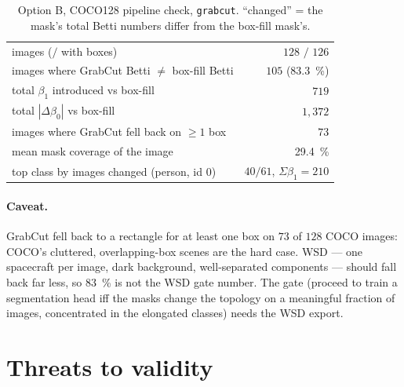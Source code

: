 \documentclass[11pt]{article}
\newcommand{\code}[1]{\texttt{\small #1}}
\newcommand{\Betti}{\beta}
\theoremstyle{definition}
\theoremstyle{plain}
\begin{document}
\begin{table}[t]
\centering
\caption{Option B, COCO128 pipeline check, \code{grabcut}. ``changed'' = the
mask's total Betti numbers differ from the box-fill mask's.}
\label{tab:optionb}
\small
\begin{tabular}{@{}lr@{}}
\toprule
images ($/$ with boxes) & $128$ $/$ $126$ \\
images where GrabCut Betti $\ne$ box-fill Betti & $105$ (\SI{83.3}{\percent}) \\
total $\Betti_1$ introduced vs box-fill & $719$ \\
total $|\Delta\Betti_0|$ vs box-fill & $1{,}372$ \\
images where GrabCut fell back on $\ge 1$ box & $73$ \\
mean mask coverage of the image & \SI{29.4}{\percent} \\
top class by images changed (person, id 0) & $40 / 61$, $\Sigma\Betti_1 = 210$ \\
\bottomrule
\end{tabular}
\end{table}

\paragraph{Caveat.} GrabCut fell back to a rectangle for at least one box on
$73$ of $128$ COCO images: COCO's cluttered, overlapping-box scenes are the hard
case. WSD --- one spacecraft per image, dark background, well-separated
components --- should fall back far less, so \SI{83}{\percent} is not the WSD
gate number. The gate (proceed to train a segmentation head iff the masks change
the topology on a meaningful fraction of images, concentrated in the elongated
classes) needs the WSD export.

\section{Threats to validity}
\label{sec:threats}
\end{document}
